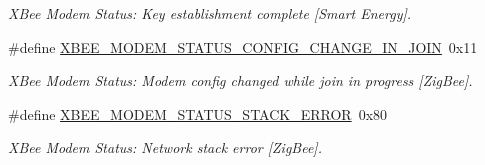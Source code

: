 \begin{DoxyCompactItemize}
\begin{DoxyCompactList}\small\item\em X\+Bee Modem Status\+: Key establishment complete \mbox{[}Smart Energy\mbox{]}. \end{DoxyCompactList}\item 
\mbox{\label{group__xbee__device_ga0e952a93b4cabed4b442f92ebe1b3066}} 
\#define \hyperlink{group__xbee__device_ga0e952a93b4cabed4b442f92ebe1b3066}{X\+B\+E\+E\+\_\+\+M\+O\+D\+E\+M\+\_\+\+S\+T\+A\+T\+U\+S\+\_\+\+C\+O\+N\+F\+I\+G\+\_\+\+C\+H\+A\+N\+G\+E\+\_\+\+I\+N\+\_\+\+J\+O\+IN}~0x11
\begin{DoxyCompactList}\small\item\em X\+Bee Modem Status\+: Modem config changed while join in progress \mbox{[}Zig\+Bee\mbox{]}. \end{DoxyCompactList}\item 
\mbox{\label{group__xbee__device_gae6c193c6ae6c9ed32dc9375fdf24abcb}} 
\#define \hyperlink{group__xbee__device_gae6c193c6ae6c9ed32dc9375fdf24abcb}{X\+B\+E\+E\+\_\+\+M\+O\+D\+E\+M\+\_\+\+S\+T\+A\+T\+U\+S\+\_\+\+S\+T\+A\+C\+K\+\_\+\+E\+R\+R\+OR}~0x80
\begin{DoxyCompactList}\small\item\em X\+Bee Modem Status\+: Network stack error \mbox{[}Zig\+Bee\mbox{]}. \end{DoxyCompactList}\end{DoxyCompactItemize}
\label{_amgrp01747264fe7bf50731df0522c351974e}%
